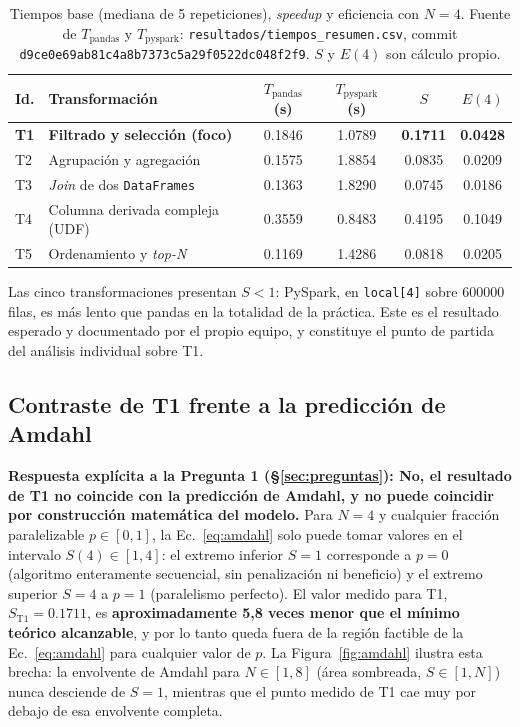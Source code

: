 \documentclass[11pt,a4paper]{article}
\newcommand{\committeam}{\texttt{d9ce0e69ab81c4a8b7373c5a29f0522dc048f2f9}}
\begin{document}
\begin{table}[h]
\centering
\caption{Tiempos base (mediana de 5 repeticiones), \textit{speedup} y eficiencia con $N=4$.
Fuente de $T_{\text{pandas}}$ y $T_{\text{pyspark}}$: \texttt{resultados/\allowbreak{}tiempos\_resumen.\allowbreak{}csv},
commit \committeam. $S$ y $E(4)$ son c\'alculo propio.}
\label{tab:tiempos}
\begin{tabular}{@{}llS[table-format=1.4]S[table-format=1.4]S[table-format=1.4]S[table-format=1.4]@{}}
\toprule
\textbf{Id.} & \textbf{Transformaci\'on} & {$T_{\text{pandas}}$ (s)} & {$T_{\text{pyspark}}$ (s)} & {$S$} & {$E(4)$} \\
\midrule
\textbf{T1} & \textbf{Filtrado y selecci\'on (foco)} & 0.1846 & 1.0789 & \textbf{0.1711} & \textbf{0.0428} \\
T2 & Agrupaci\'on y agregaci\'on & 0.1575 & 1.8854 & 0.0835 & 0.0209 \\
T3 & \textit{Join} de dos \texttt{DataFrames} & 0.1363 & 1.8290 & 0.0745 & 0.0186 \\
T4 & Columna derivada compleja (UDF) & 0.3559 & 0.8483 & 0.4195 & 0.1049 \\
T5 & Ordenamiento y \textit{top-N} & 0.1169 & 1.4286 & 0.0818 & 0.0205 \\
\bottomrule
\end{tabular}
\end{table}

Las cinco transformaciones presentan $S<1$: PySpark, en \texttt{local[4]} sobre
\num{600000} filas, es m\'as lento que pandas en la totalidad de la pr\'actica. Este es el
resultado esperado y documentado por el propio equipo, y constituye el punto de partida del
an\'alisis individual sobre T1.

\subsection{Contraste de T1 frente a la predicci\'on de Amdahl}
\label{sec:contraste-amdahl}

\textbf{Respuesta expl\'icita a la Pregunta 1 (\S\ref{sec:preguntas}): No, el resultado de T1
no coincide con la predicci\'on de Amdahl, y no puede coincidir por construcci\'on
matem\'atica del modelo.} Para $N=4$ y cualquier fracci\'on paralelizable $p\in[0,1]$, la
Ec.~\eqref{eq:amdahl} solo puede tomar valores en el intervalo $S(4)\in[1,4]$: el extremo
inferior $S=1$ corresponde a $p=0$ (algoritmo enteramente secuencial, sin penalizaci\'on ni
beneficio) y el extremo superior $S=4$ a $p=1$ (paralelismo perfecto). El valor medido para
T1, $S_{\text{T1}}=0.1711$, es \textbf{aproximadamente 5,8 veces menor que el m\'inimo
te\'orico alcanzable}, y por lo tanto queda fuera de la regi\'on factible de la Ec.~\eqref{eq:amdahl}
para cualquier valor de $p$. La Figura~\ref{fig:amdahl} ilustra esta brecha: la envolvente de
Amdahl para $N\in[1,8]$ (\'area sombreada, $S\in[1,N]$) nunca desciende de $S=1$, mientras que
el punto medido de T1 cae muy por debajo de esa envolvente completa.
\end{document}

